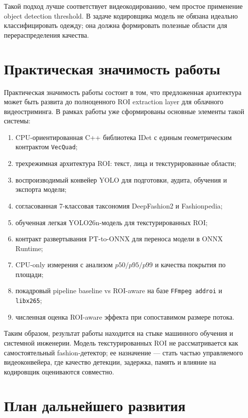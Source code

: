 \documentclass[12pt,a4paper,oneside,openany]{report}
\begin{document}
Такой подход лучше соответствует видеокодированию, чем простое применение object detection
threshold. В задаче кодировщика модель не обязана идеально классифицировать одежду; она должна
формировать полезные области для перераспределения качества.


\section{Практическая значимость работы}

Практическая значимость работы состоит в том, что предложенная архитектура может быть развита до
полноценного ROI extraction layer для облачного видеостриминга. В рамках работы уже сформированы
основные элементы такой системы:
\begin{enumerate}[label=\arabic*)]
  \item CPU-ориентированная C++ библиотека IDet с единым геометрическим контрактом
      \texttt{VecQuad};
  \item трехрежимная архитектура ROI: текст, лица и текстурированные области;
  \item воспроизводимый конвейер YOLO для подготовки, аудита, обучения и экспорта модели;
  \item согласованная 7-классовая таксономия DeepFashion2 и Fashionpedia;
  \item обученная легкая YOLO26n-модель для текстурированных ROI;
  \item контракт развертывания PT-to-ONNX для переноса модели в ONNX Runtime;
  \item CPU-only измерения с анализом $p50/p95/p99$ и качества покрытия по площади;
  \item покадровый pipeline baseline vs ROI-aware на базе \texttt{FFmpeg addroi} и
      \texttt{libx265};
  \item численная оценка ROI-aware эффекта при сопоставимом размере потока.
\end{enumerate}

Таким образом, результат работы находится на стыке машинного обучения и системной инженерии.
Модель текстурированных ROI не рассматривается как самостоятельный fashion-детектор; ее
назначение --- стать частью управляемого видеоконвейера, где качество детекции, задержка, память
и влияние на кодировщик оцениваются совместно.


\section{План дальнейшего развития}
\end{document}

